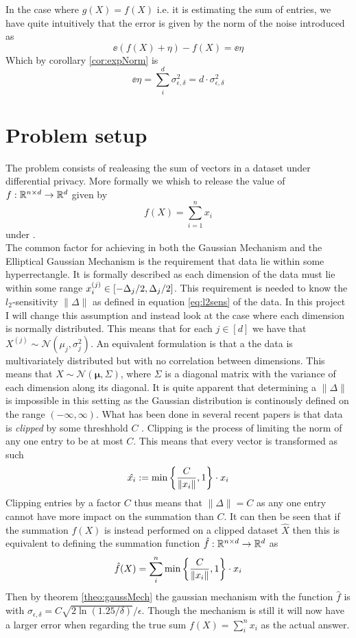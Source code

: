 \documentclass[a4paper,12pt]{article}
\begin{document}
In the case where $g(X) = f(X)$ i.e. it is estimating the sum
of entries, we have quite intuitively that the error is given by 
the norm of the noise introduced as
\[
    \ee{(f(X) + \eta) - f(X)} = 
    \ee{\eta}
\]
Which by corollary \ref{cor:expNorm} is 
\[
    \ee{\eta} = \sum_i^d \sigma_{\epsilon,\delta}^2 = d \cdot \sigma_{\epsilon,\delta}^2
\]




\section{Problem setup}
The problem consists of realeasing the sum of vectors 
in a dataset under differential privacy.
More formally we whish to release the value of 
$f:\mathbb{R}^{n \times d} \rightarrow  \mathbb{R}^d$ given by
\[ f(X) = \sum_{i = 1}^n x_i  \] 
under \edp. \\
The common factor for achieving \edp in both the Gaussian Mechanism
and the Elliptical Gaussian Mechanism is the requirement that 
data lie within some hyperrectangle. It is formally described as 
each dimension of the data must lie within some range 
$ x^{(j)}_i \in \left [-\Delta_j/2, \Delta_j/2 \right] $. 
This requirement is needed to know the $l_2$-sensitivity $\| \Delta \|$ 
as defined in equation \ref{eq:l2sens} of the data.
In this project I will change this assumption and instead 
look at the case where each dimension is normally distributed.
This means that for each 
$ j \in [d] $ we have that 
$X^{(j)} \sim \mathcal{N}(\mu_j, \sigma_j^2)$.
An equivalent formulation is that a the data is 
multivariately distributed but with no correlation between dimensions.
This means that $X \sim \mathcal{N}(\bm{\mu}, \Sigma ) $, 
where $\Sigma$ is a diagonal matrix with the variance of each 
dimension along its diagonal.
It is quite apparent that determining a $ \| \Delta \|$ is impossible 
in this setting as the Gaussian distribution is continously defined 
on the range $ (-\infty, \infty)$. What has been done in several 
recent papers is that data is \textit{clipped} by some threshhold 
$C$ \cite{Huang2021,coinpress}. 
Clipping is the process of limiting the norm of any one entry 
to be at most $C$. This means that every vector is transformed as such
\[
    \hat{x_i} := \min \left \{\frac{C}{\| x_i \|}, 1\right\} \cdot x_i
\]
Clipping entries by a factor $C$ thus means that $\| \Delta \| = C $ 
as any one entry cannot have more impact on the summation than $C$.
It can then be seen that if the summation $f(X)$ is instead 
performed on a clipped dataset $\hat{X}$ then this is equivalent to
defining the summation function $\hat{f}: \mathbb{R}^{n \times d} \rightarrow \mathbb{R}^d$ as
\[
    \hat{f}(X) = \sum_i^n \min \left \{ \frac{C}{\| x_i \|}, 1\right\} \cdot x_i
    \]
Then by theorem \ref{theo:gaussMech} the 
gaussian mechanism with the function $\hat{f}$ is \edp with
$\sigma_{\epsilon, \delta} = C \sqrt{2 \ln (1.25/\delta)}/\epsilon$.
Though the mechanism is still \edp it will now have 
a larger error when regarding the true sum
$f(X) = \sum_i^n x_i$ as the actual answer.
\end{document}
